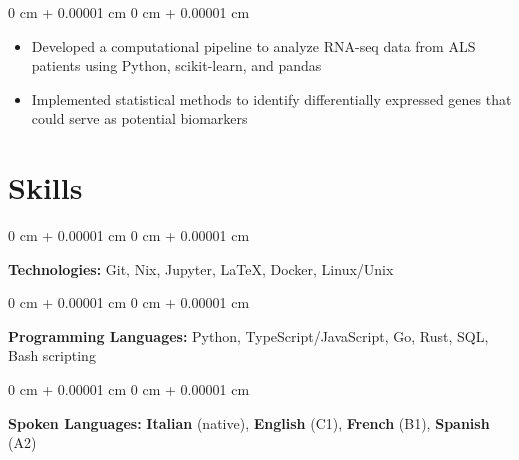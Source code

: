 \documentclass[10pt, letterpaper]{article}
\newenvironment{highlights}{
    \begin{itemize}[
        topsep=0.10 cm,
        parsep=0.10 cm,
        partopsep=0pt,
        itemsep=0pt,
        leftmargin=0 cm + 10pt
    ]
}{
    \end{itemize}
} %
\newenvironment{onecolentry}{
    \begin{adjustwidth}{
        0 cm + 0.00001 cm
    }{
        0 cm + 0.00001 cm
    }
}{
    \end{adjustwidth}
} %
\begin{document}
        \vspace{0.10 cm}
        \begin{onecolentry}
            \begin{highlights}
                \item Developed a computational pipeline to analyze RNA-seq data from ALS patients using Python, scikit-learn, and pandas
                \item Implemented statistical methods to identify differentially expressed genes that could serve as potential biomarkers
            \end{highlights}
        \end{onecolentry}

        \vspace{0.2 cm}

    \section{Skills}
        \begin{onecolentry}
            \textbf{Technologies:} Git, Nix, Jupyter, LaTeX, Docker, Linux/Unix
        \end{onecolentry}

        \vspace{0.2 cm}

        \begin{onecolentry}
            \textbf{Programming Languages:} Python, TypeScript/JavaScript, Go, Rust, SQL, Bash scripting
        \end{onecolentry}

        \vspace{0.2 cm}

        \begin{onecolentry}
          \textbf{Spoken Languages:} \textbf{Italian} (native), \textbf{English} (C1), \textbf{French} (B1), \textbf{Spanish} (A2)
        \end{onecolentry}
\end{document}
